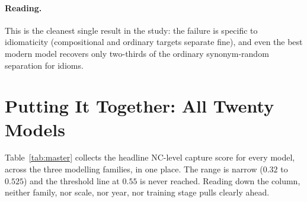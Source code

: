 \documentclass[11pt]{article}
\begin{document}
\paragraph{Reading.} This is the cleanest single result in the study: the failure is specific to
idiomaticity (compositional and ordinary targets separate fine), and even the best modern model
recovers only two-thirds of the ordinary synonym-random separation for idioms.

\section{Putting It Together: All Twenty Models}
\label{sec:together}

Table~\ref{tab:master} collects the headline NC-level capture score for every model, across the three
modelling families, in one place. The range is narrow ($0.32$ to $0.525$) and the threshold line at
$0.55$ is never reached. Reading down the column, neither family, nor scale, nor year, nor training
stage pulls clearly ahead.
\end{document}
